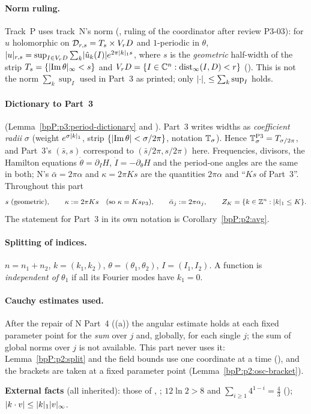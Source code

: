 \paragraph{Norm ruling.} Track~P uses track~N's norm (, ruling of the coordinator after review P3-03): for $u$ holomorphic on $\mathcal D_{r,s}=T_s\times V_rD$ and $1$-periodic in $\theta$,
$\lvert u\rvert_{r,s}=\sup_{I\in V_rD}\sum_k\lvert \hat u_k(I)\rvert e^{2\pi\lvert k\rvert_1s}$, where $s$ is the \emph{geometric} half-width of the strip $T_s=\{\lvert \operatorname{Im}\theta\rvert_\infty<s\}$ and
$V_rD=\{I\in\mathbb{C}^n:\operatorname{dist}_\infty(I,D)<r\}$ (). This is not the norm $\sum_k\sup_I$ used in Part~3 as printed; only $\lvert \cdot\rvert_{,}\le\sum_k\sup_I$ holds.

\paragraph{Dictionary to Part~3} (Lemma~\ref{bpP:p3:period-dictionary} and ). Part~3 writes widths as \emph{coefficient radii} $\sigma$ (weight $e^{\sigma\lvert k\rvert_1}$, strip $\{\lvert \operatorname{Im}\theta\rvert<\sigma/2\pi\}$, notation $\mathbb{T}_\sigma$).
Hence $\mathbb{T}_{\sigma}^{\text{P3}}=T_{\sigma/2\pi}$, and Part~3's $(\bar s,s)$ correspond to $(\bar s/2\pi,s/2\pi)$ here. Frequencies, divisors, the Hamilton equations $\dot\theta=\partial_IH$, $\dot I=-\partial_\theta H$ and the period-one angles are the same in both; N's $\bar\alpha=2\pi\alpha$ and $\kappa=2\pi Ks$ are
the quantities $2\pi\alpha$ and ``$Ks$ of Part~3''. Throughout this part
\[ s\ \text{(geometric)},\qquad \kappa:=2\pi Ks\quad(\text{so }\kappa=K s_{\text{P3}}),\qquad\bar\alpha_j:=2\pi\alpha_j,\qquad Z_K=\{k\in\Z^n:\abs k_1\le K\}. \]
The statement for Part~3 in its own notation is Corollary~\ref{bpP:p2:avg}.

\paragraph{Splitting of indices.} $n=n_1+n_2$, $k=(k_1,k_2)$, $\theta=(\theta_1,\theta_2)$, $I=(I_1,I_2)$. A function is \emph{independent of $\theta_1$} if all its Fourier modes have $k_1=0$.

\paragraph{Cauchy estimates used.} After the repair of N Part~4 ((a)) the angular estimate holds at each fixed parameter point for the \emph{sum} over $j$ and, globally, for each single $j$; the sum of global norms over $j$ is not available. This part never uses it: Lemma~\ref{bpP:p2:split} and the field bounds use one coordinate at a time (), and the brackets are taken at a fixed parameter point (Lemma~\ref{bpP:p2:osc-bracket}).\par\noindent\textbf{External facts} (all inherited): those of , ; $12\ln2>8$ and $\sum_{i\ge1}4^{1-i}=\tfrac43$ (); $\lvert k\cdot v\rvert\le\lvert k\rvert_1\lvert v\rvert_\infty$.

